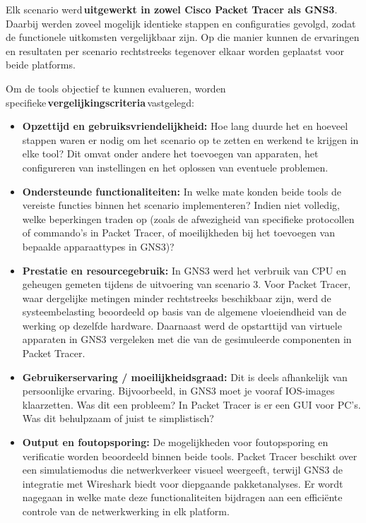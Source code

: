 Elk scenario werd \textbf{uitgewerkt in zowel Cisco Packet Tracer als GNS3}. Daarbij werden zoveel mogelijk identieke stappen en configuraties gevolgd, zodat de functionele uitkomsten vergelijkbaar zijn. Op die manier kunnen de ervaringen en resultaten per scenario rechtstreeks tegenover elkaar worden geplaatst voor beide platforms.

\vspace{0.5cm}
Om de tools objectief te kunnen evalueren, worden specifieke \textbf{vergelijkingscriteria} vastgelegd:
\begin{itemize}
    \item \textbf{Opzettijd en gebruiksvriendelijkheid:} Hoe lang duurde het en hoeveel stappen waren er nodig om het scenario op te zetten en werkend te krijgen in elke tool? Dit omvat onder andere het toevoegen van apparaten, het configureren van instellingen en het oplossen van eventuele problemen.
    
    \item \textbf{Ondersteunde functionaliteiten:} In welke mate konden beide tools de vereiste functies binnen het scenario implementeren? Indien niet volledig, welke beperkingen traden op (zoals de afwezigheid van specifieke protocollen of commando’s in Packet Tracer, of moeilijkheden bij het toevoegen van bepaalde apparaattypes in GNS3)?
    
    \item \textbf{Prestatie en resourcegebruik:} In GNS3 werd het verbruik van CPU en geheugen gemeten tijdens de uitvoering van scenario 3. Voor Packet Tracer, waar dergelijke metingen minder rechtstreeks beschikbaar zijn, werd de systeembelasting beoordeeld op basis van de algemene vloeiendheid van de werking op dezelfde hardware. Daarnaast werd de opstarttijd van virtuele apparaten in GNS3 vergeleken met die van de gesimuleerde componenten in Packet Tracer.
    
    \item \textbf{Gebruikerservaring / moeilijkheidsgraad:} Dit is deels afhankelijk van persoonlijke ervaring. Bijvoorbeeld, in GNS3 moet je vooraf IOS-images klaarzetten. Was dit een probleem? In Packet Tracer is er een GUI voor PC's. Was dit behulpzaam of juist te simplistisch?
    
    \item \textbf{Output en foutopsporing:} De mogelijkheden voor foutopsporing en verificatie worden beoordeeld binnen beide tools. Packet Tracer beschikt over een simulatiemodus die netwerkverkeer visueel weergeeft, terwijl GNS3 de integratie met Wireshark biedt voor diepgaande pakketanalyses. Er wordt nagegaan in welke mate deze functionaliteiten bijdragen aan een efficiënte controle van de netwerkwerking in elk platform.
\end{itemize}

